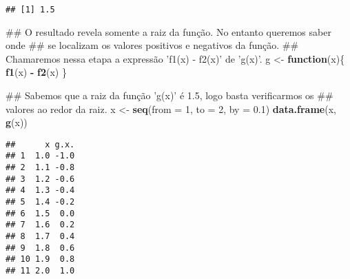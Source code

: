 \documentclass[]{book}
\newenvironment{Shaded}{\begin{snugshade}}{\end{snugshade}}
\newcommand{\KeywordTok}[1]{\textcolor[rgb]{0.13,0.29,0.53}{\textbf{#1}}}
\newcommand{\DataTypeTok}[1]{\textcolor[rgb]{0.13,0.29,0.53}{#1}}
\newcommand{\DecValTok}[1]{\textcolor[rgb]{0.00,0.00,0.81}{#1}}
\newcommand{\FloatTok}[1]{\textcolor[rgb]{0.00,0.00,0.81}{#1}}
\newcommand{\StringTok}[1]{\textcolor[rgb]{0.31,0.60,0.02}{#1}}
\newcommand{\ControlFlowTok}[1]{\textcolor[rgb]{0.13,0.29,0.53}{\textbf{#1}}}
\newcommand{\OperatorTok}[1]{\textcolor[rgb]{0.81,0.36,0.00}{\textbf{#1}}}
\newcommand{\NormalTok}[1]{#1}
\begin{document}
\begin{verbatim}
## [1] 1.5
\end{verbatim}

\begin{Shaded}
\begin{Highlighting}[]
\NormalTok{##  O resultado revela somente a raiz da função. No entanto queremos saber onde}
\NormalTok{## se localizam os valores positivos e negativos da função.}
\NormalTok{##  Chamaremos nessa etapa a expressão 'f1(x) - f2(x)' de 'g(x)'.}
\NormalTok{g <-}\StringTok{ }\ControlFlowTok{function}\NormalTok{(x)\{}
  \KeywordTok{f1}\NormalTok{(x) }\OperatorTok{-}\StringTok{ }\KeywordTok{f2}\NormalTok{(x)}
\NormalTok{\}}

\NormalTok{##  Sabemos que a raiz da função 'g(x)' é 1.5, logo basta verificarmos os}
\NormalTok{## valores ao redor da raiz.}
\NormalTok{x <-}\StringTok{ }\KeywordTok{seq}\NormalTok{(}\DataTypeTok{from =} \DecValTok{1}\NormalTok{, }\DataTypeTok{to =} \DecValTok{2}\NormalTok{, }\DataTypeTok{by =} \FloatTok{0.1}\NormalTok{)}
\KeywordTok{data.frame}\NormalTok{(x, }\KeywordTok{g}\NormalTok{(x))}
\end{Highlighting}
\end{Shaded}

\begin{verbatim}
##      x g.x.
## 1  1.0 -1.0
## 2  1.1 -0.8
## 3  1.2 -0.6
## 4  1.3 -0.4
## 5  1.4 -0.2
## 6  1.5  0.0
## 7  1.6  0.2
## 8  1.7  0.4
## 9  1.8  0.6
## 10 1.9  0.8
## 11 2.0  1.0
\end{verbatim}
\end{document}
